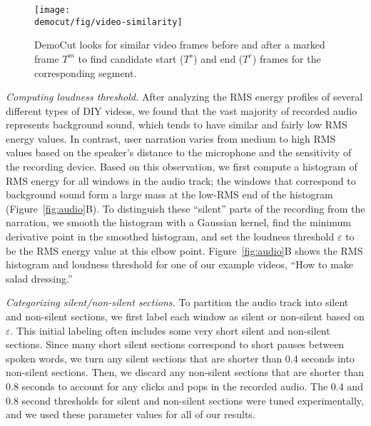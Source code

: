 \begin{figure}[t]
  \centering
\texttt{[image: \\democut/fig/video-similarity]}
  \caption{DemoCut looks for similar video frames before and
after a marked frame $T^m$ to find candidate start ($T^s$) and end ($T^e$) frames
for the corresponding segment.}
 \label{fig:video-similarity}
   \vspace{-0.05in} %
\end{figure}



\emph{Computing loudness threshold.} After analyzing the RMS energy
profiles of several different types of DIY videos, we found that the
vast majority of recorded audio represents background sound, which
tends to have similar and fairly low RMS energy values. In contrast,
user narration varies from medium to high RMS values based on the
speaker's distance to the microphone and the sensitivity of the
recording device. Based on this observation, we first compute a histogram
of RMS energy for all windows in the audio track; the windows that
correspond to background sound form a large mass at the low-RMS end of
the histogram (Figure~\ref{fig:audio}B).
%
To distinguish these ``silent'' parts of the recording from the
narration, we smooth the histogram with a Gaussian kernel, find the
minimum derivative point in the smoothed histogram, and set the
loudness threshold $\varepsilon$ to be the RMS energy value at this
elbow point.
%
Figure~\ref{fig:audio}B shows the RMS histogram and loudness threshold
for one of our example videos, ``How to make salad dressing.''

\emph{Categorizing silent/non-silent sections.} To partition the audio
track into silent and non-silent sections, we first label each window
as silent or non-silent based on $\varepsilon$.
%
This initial labeling often includes some very short silent and
non-silent sections.
%
Since many short silent sections correspond to short pauses between
spoken words, we turn any silent sections that are shorter than 0.4
seconds into non-silent sections.
%
Then, we discard any non-silent sections that are shorter than 0.8
seconds to account for any clicks and pops in the recorded audio.
%
The 0.4 and 0.8 second thresholds for silent and non-silent sections
were tuned experimentally, and we used these parameter values for all
of our results.
%

